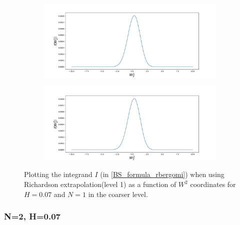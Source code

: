 \documentclass[11pt]{article}
\begin{document}
 \begin{figure}[h!]
 	\centering
 	\begin{subfigure}{.4\textwidth}
 		\centering
 		\includegraphics[width=1\linewidth]{./figures/integrand_richardson_plotting_rBergomi/N_1/W_2/Bergomi_integrand_rich_level1_K_1_H_007_y3f_N_1}
 		\caption{}
 		\label{fig:sub3}
 	\end{subfigure}%
 	\begin{subfigure}{.4\textwidth}
 		\centering
 		\includegraphics[width=1\linewidth]{./figures/integrand_richardson_plotting_rBergomi/N_1/W_2/Bergomi_integrand_rich_level1_K_1_H_007_y4f_N_1}
 		\caption{}
 		\label{fig:sub4}
 	\end{subfigure}
 	\caption{Plotting the integrand $I$ (in \eqref{BS_formula_rbergomi}) when using Richardson extrapolation(level 1) as a function of $W^2$ coordinates for $H=0.07$ and $N=1$ in the coarser level.}
 	\label{fig:Integrand_rich_level1_H_007_N_1_W_2}
 \end{figure}
 
 
 \newpage
 \subsubsection*{N=2, H=0.07}
 
\end{document}
